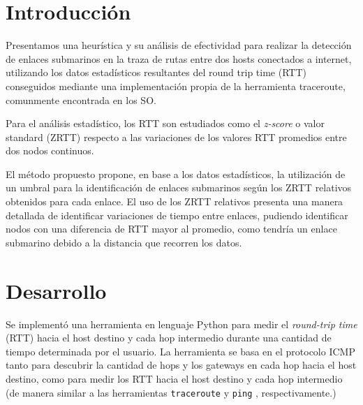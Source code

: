 \documentclass[a4paper, 10pt, twoside]{article}
\begin{document}
\newpage




\tableofcontents

\newpage




\section{Introducción}

Presentamos una heurística y su análisis de efectividad para realizar la detección de enlaces submarinos en la traza de rutas entre dos hosts conectados a internet, utilizando los datos estadísticos resultantes del round trip time (RTT) conseguidos mediante una implementación propia de la herramienta traceroute, comunmente encontrada en los SO.

Para el análisis estadístico, los RTT son estudiados como el \textit{z-score} o valor standard (ZRTT) respecto a las variaciones de los valores RTT promedios entre dos nodos continuos. 

El método propuesto propone, en base a los datos estadísticos, la utilización de un umbral para la identificación de enlaces submarinos según los ZRTT relativos obtenidos para cada enlace. El uso de los ZRTT relativos presenta una manera detallada de identificar variaciones de tiempo entre enlaces, pudiendo identificar nodos con una diferencia de RTT mayor al promedio, como tendría un enlace submarino debido a la distancia que recorren los datos.




\section{Desarrollo}

Se implementó una herramienta en lenguaje Python para medir el \emph{round-trip time} (RTT) hacia el host destino y cada hop intermedio durante una cantidad de tiempo determinada por el usuario. La herramienta se basa en el protocolo ICMP \cite{rfc-792} tanto para descubrir la cantidad de hops y los gateways en cada hop hacia el host destino, como para medir los RTT hacia el host destino y cada hop intermedio (de manera similar a las herramientas \texttt{traceroute} \cite{wiki-traceroute} y \texttt{ping} \cite{wiki-ping}, respectivamente.)
\end{document}
